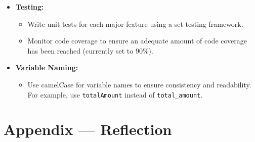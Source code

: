 \documentclass{article}
\begin{document}
\begin{itemize}
    \item \textbf{Testing:}
    \begin{itemize}
        \item Write unit tests for each major feature using a set testing framework.
        \item Monitor code coverage to ensure an adequate amount of code coverage has been reached (currently set to 90\%).
    \end{itemize}
    \item \textbf{Variable Naming:}
  \begin{itemize}
      \item Use camelCase for variable names to ensure consistency and readability. For example, use \texttt{totalAmount} instead of \texttt{total\_amount}.
  \end{itemize}
\end{itemize}

\newpage{}

\section*{Appendix --- Reflection}
\end{document}
